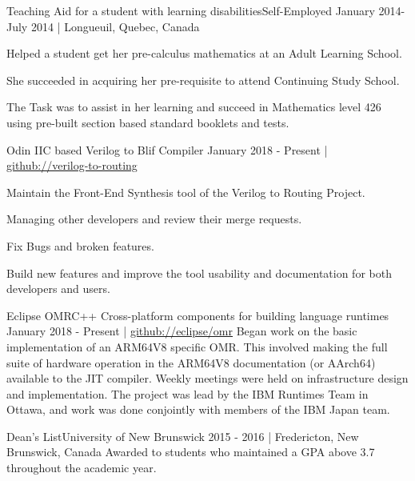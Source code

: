 \documentclass[english,letterpaper,12pt]{deedy-resume-openfont}
\begin{document}
    \employement%
        {Teaching Aid for a student with learning disabilities}{Self-Employed}
        {January 2014-July 2014 | Longueuil, Quebec, Canada}{%
        \begin{tightemize}
        \item Helped a student get her pre-calculus mathematics at an Adult Learning School.
        \item She succeeded in acquiring her pre-requisite to attend Continuing Study School.
        \item The Task was to assist in her learning and succeed in Mathematics level 426 using pre-built section based standard booklets and tests.
        \end{tightemize}
        }




    \employement%
        {Odin II}{C based Verilog to Blif Compiler}
        {January 2018 - Present | \href{https://github.com/verilog-to-routing/vtr-verilog-to-routing/graphs/contributors}{github://verilog-to-routing}}{%
        Maintain the Front-End Synthesis tool of the Verilog to Routing Project.
        \begin{tightemize}
        \item Managing other developers and review their merge requests.
        \item Fix Bugs and broken features.
        \item Build new features and improve the tool usability and documentation for both developers and users.
        \end{tightemize}
        }

    \employement%
        {Eclipse OMR}{C++ Cross-platform components for building language runtimes}
        {January 2018 - Present | \href{https://github.com/eclipse/omr}{github://eclipse/omr}}{%
        Began work on the basic implementation of an ARM64V8 specific OMR. 
        This involved making the full suite of hardware operation in the ARM64V8 documentation (or AArch64) available to the JIT compiler. 
        Weekly meetings were held on infrastructure design and implementation. 
        The project was lead by the IBM Runtimes Team in Ottawa, and work was done conjointly with members of the IBM Japan team.
        }



    \employement%
        {Dean's List}{University of New Brunswick}
        {2015 - 2016 | Fredericton, New Brunswick, Canada}{%
        Awarded to students who maintained a GPA above 3.7 throughout the academic year.
        }
\end{document}

